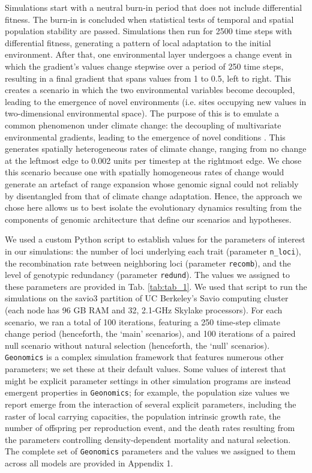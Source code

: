 \documentclass[9pt,twocolumn,twoside,lineno]{pnas-new}
\begin{document}
{Simulations start with a neutral burn-in period that does not include differential fitness.
The burn-in is concluded when statistical tests
of temporal and spatial population stability are passed.
Simulations then run for 2500 time steps with differential fitness,
generating a pattern of local adaptation to the initial environment.
After that, one environmental layer undergoes a change 
event in which the gradient’s values change stepwise over a period of 250 time steps,
resulting in a final gradient that spans values from 1 to 0.5, left to right.
This creates a scenario in 
which the two environmental variables become decoupled, leading 
to the emergence of novel environments (i.e. sites occupying new values in 
two-dimensional environmental space).
The purpose of this is to emulate a common 
phenomenon under climate change: the decoupling of multivariate environmental gradients,
leading to the emergence of novel conditions
\cite{williams_novel_climates,williams_projected_novel_disappearing,fitzpatrick}.
This generates spatially heterogeneous rates of climate change, ranging from no change at the leftmost edge to 0.002 units per timestep at the rightmost edge.
We chose this scenario because one with spatially homogeneous rates of change would generate an artefact of range expansion
whose genomic signal could not reliably by disentangled from that of
climate change adaptation. Hence, the approach we chose here allows us
to best isolate the evolutionary dynamics
resulting from the components of genomic architecture
that define our scenarios and hypotheses.

We used a custom Python script to establish values for the parameters of interest in our simulations: the number of loci underlying
each trait (parameter \texttt{n\_loci}),
the recombination rate between neighboring loci
(parameter \texttt{recomb}),
and the level of genotypic redundancy (parameter \texttt{redund}).
The values we assigned to these parameters are provided in Tab. \ref{tab:tab_1}.
We used that script to run the simulations on the 
savio3 partition of UC Berkeley’s Savio computing cluster (each node has 96 GB RAM and 32, 
2.1-GHz Skylake processors). For each scenario, we ran a total of 100 iterations, featuring a 250 time-step climate change period (henceforth, 
the ‘main’ scenarios), and 100 iterations of a paired null scenario without natural 
selection (henceforth, the ‘null’ scenarios). 
\texttt{Geonomics} is a complex simulation framework that features numerous other 
parameters; we set these at their default values.
Some values of interest that might be explicit parameter settings in
other simulation programs are instead
emergent properties in \texttt{Geonomics}; for example, the population size values we report emerge from the interaction
of several explicit parameters, including the raster of local carrying capacities,
the population intrinsic growth rate, the number of offspring per reproduction event,
and the death rates resulting from the parameters controlling density-dependent mortality
and natural selection.
The complete set of \texttt{Geonomics} parameters and the values 
we assigned to them across all models are provided in Appendix 1.

}
\end{document}
